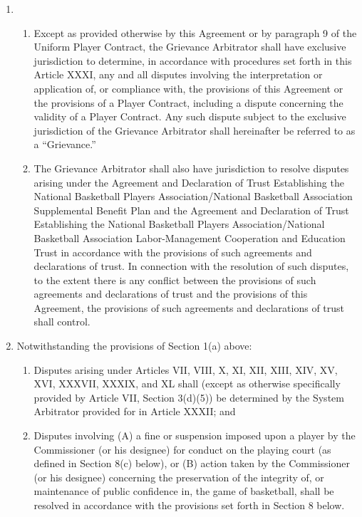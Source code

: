 \documentclass[
]{book}
\providecommand{\tightlist}{%
  \setlength{\itemsep}{0pt}\setlength{\parskip}{0pt}}
\begin{document}
\begin{enumerate}
\def\labelenumi{(\alph{enumi})}
\item
  \begin{enumerate}
  \def\labelenumii{(\roman{enumii})}
  \tightlist
  \item
    Except as provided otherwise by this Agreement or by paragraph 9 of the Uniform Player Contract, the Grievance Arbitrator shall have exclusive jurisdiction to determine, in accordance with procedures set forth in this Article XXXI, any and all disputes involving the interpretation or application of, or compliance with, the provisions of this Agreement or the provisions of a Player Contract, including a dispute concerning the validity of a Player Contract. Any such dispute subject to the exclusive jurisdiction of the Grievance Arbitrator shall hereinafter be referred to as a ``Grievance.''
  \item
    The Grievance Arbitrator shall also have jurisdiction to resolve disputes arising under the Agreement and Declaration of Trust Establishing the National Basketball Players Association/National Basketball Association Supplemental Benefit Plan and the Agreement and Declaration of Trust Establishing the National Basketball Players Association/National Basketball Association Labor-Management Cooperation and Education Trust in accordance with the provisions of such agreements and declarations of trust. In connection with the resolution of such disputes, to the extent there is any conflict between the provisions of such agreements and declarations of trust and the provisions of this Agreement, the provisions of such agreements and declarations of trust shall control.
  \end{enumerate}
\item
  Notwithstanding the provisions of Section 1(a) above:

  \begin{enumerate}
  \def\labelenumii{(\roman{enumii})}
  \tightlist
  \item
    Disputes arising under Articles VII, VIII, X, XI, XII, XIII, XIV, XV, XVI, XXXVII, XXXIX, and XL shall (except as otherwise specifically provided by Article VII, Section 3(d)(5)) be determined by the System Arbitrator provided for in Article XXXII; and
  \item
    Disputes involving (A) a fine or suspension imposed upon a player by the Commissioner (or his designee) for conduct on the playing court (as defined in Section 8(c) below), or (B) action taken by the Commissioner (or his designee) concerning the preservation of the integrity of, or maintenance of public confidence in, the game of basketball, shall be resolved in accordance with the provisions set forth in Section 8 below.
  \end{enumerate}
\end{enumerate}
\end{document}
